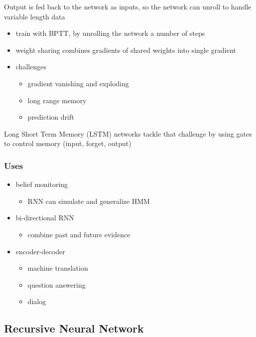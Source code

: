 \documentclass[]{article}
\theoremstyle{definition}
\begin{document}
Output is fed back to the network as inputs, so the network can unroll to handle variable length data

\begin{itemize}
    \item train with BPTT, by unrolling the network a number of steps
    \item weight sharing combines gradients of shared weights into single gradient
    \item challenges
        \begin{itemize}
            \item gradient vanishing and exploding
            \item long range memory
            \item prediction drift
        \end{itemize}
\end{itemize}

Long Short Term Memory (LSTM) networks tackle that challenge by using gates to control memory (input, forget, output)

\subsubsection{Uses}
\label{ssub:Uses}

\begin{itemize}
    \item belief monitoring
        \begin{itemize}
            \item RNN can simulate and generalize HMM
        \end{itemize}
    \item bi-directional RNN
        \begin{itemize}
            \item combine past and future evidence
        \end{itemize}
    \item encoder-decoder
        \begin{itemize}
            \item machine translation
            \item question answering
            \item dialog
        \end{itemize}
\end{itemize}

\subsection{Recursive Neural Network}
\label{sub:recursive_neural_network}
\end{document}
